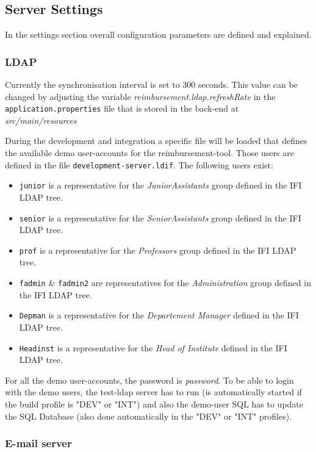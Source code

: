 \subsection{Server Settings}
In the settings section overall configuration parameters are defined and explained.

\subsubsection{LDAP}
\label{subsubsec:ldap}

Currently the synchronisation interval is set to 300 seconds. This value can be changed by adjusting the variable \textit{reimbursement.ldap.refreshRate} in the \texttt{application.properties} file that is stored in the back-end at \textit{src/main/resources} \par
During the development and integration a specific file will be loaded that defines the available demo user-accounts for the reimbursement-tool. Those users are defined in the file \texttt{development-server.ldif}. The following users exist:
\begin{itemize}
\item \texttt{junior} is a representative for the \textit{JuniorAssistants} group defined in the IFI LDAP tree.
\item \texttt{senior} is a representative for the \textit{SeniorAssistants} group defined in the IFI LDAP tree.
\item \texttt{prof} is a representative for the \textit{Professors} group defined in the IFI LDAP tree.
\item \texttt{fadmin} \& \texttt{fadmin2} are representatives for the \textit{Administration} group defined in the IFI LDAP tree.
\item \texttt{Depman} is a representative for the \textit{Departement Manager} defined in the IFI LDAP tree.
\item \texttt{Headinst} is a representative for the \textit{Head of Institute} defined in the IFI LDAP tree.

\end{itemize}

For all the demo user-accounts, the password is \textit{password}. To be able to login with the demo users, the test-ldap server has to run (is automatically started if the build profile is "DEV" or "INT") and also the demo-user SQL has to update the SQL Database (also done automatically in the "DEV" or "INT" profiles).

\subsubsection{E-mail server}
\label{subsubsec:email}

